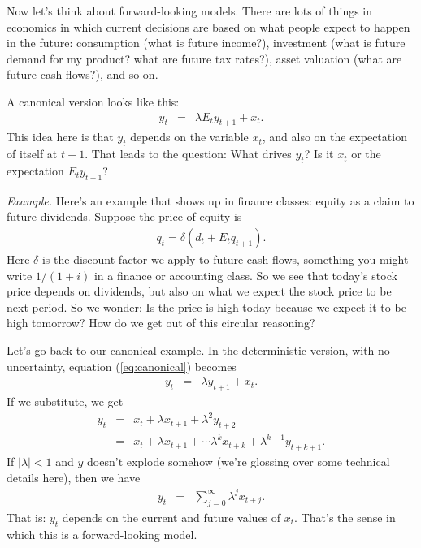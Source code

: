 \documentclass[11pt]{article}
\begin{document}
Now let's think about forward-looking models.
There are lots of things in economics in which current decisions are based on
what people expect to happen in the future:
consumption (what is future income?), investment (what is future demand for my product?
what are future tax rates?),
asset valuation (what are future cash flows?), and so on.

A canonical version looks like this:
\begin{eqnarray}
    y_t &=& \lambda E_t y_{t+1} + x_t .
    \label{eq:canonical}
\end{eqnarray}
This idea here is that $y_t$ depends on the variable $x_t$,
and also on the expectation of itself at $t+1$.
That leads to the question: What drives $y_t$?
Is it $x_t$ or the expectation $E_t y_{t+1}$?

{\it Example.\/}
Here's an example that shows up in finance classes: equity as a claim to future dividends.
Suppose the price of equity is
\begin{eqnarray*}
    q_t = \delta (d_t + E_t q_{t+1} ) .
\end{eqnarray*}
Here $\delta$ is the discount factor we apply to future cash flows,
something you might write $1/(1+i)$ in a finance or accounting class.
So we see that today's stock price depends on dividends, but also
on what we expect the stock price to be next period.
So we wonder:  Is the price is high today because we expect it to be high tomorrow?
How do we get out of this circular reasoning?


Let's go back to our canonical example.
In the deterministic version, with no uncertainty,
equation (\ref{eq:canonical}) becomes
\begin{eqnarray*}
    y_t &=&  \lambda y_{t+1} + x_{t} .
\end{eqnarray*}
If we substitute, we get
\begin{eqnarray*}
    y_t &=&  x_t + \lambda x_{t+1} + \lambda^2 y_{t+2}  \\
        &=&  x_t + \lambda x_{t+1} + \cdots \lambda^k x_{t+k} + \lambda^{k+1} y_{t+k+1} .
\end{eqnarray*}
If $|\lambda | < 1$ and $y$ doesn't explode somehow (we're glossing over some technical details here),
then we have
\begin{eqnarray*}
    y_t &=&  \sum_{j=0}^\infty \lambda^j x_{t+j} .
\end{eqnarray*}
That is:  $y_t$ depends on the current and future values of $x_t$.
That's the sense in which this is a forward-looking model.
\end{document}
